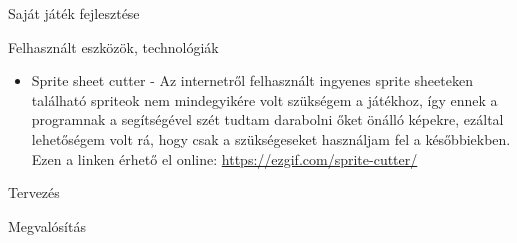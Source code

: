 \begin{MyChapter}{Saját játék fejlesztése}
\begin{MySection}{Felhasznált eszközök, technológiák}
\begin{itemize}
			\item Sprite sheet cutter - Az internetről felhasznált ingyenes sprite sheeteken található spriteok nem mindegyikére volt szükségem a játékhoz, így ennek a programnak a segítségével szét tudtam darabolni őket önálló képekre, ezáltal lehetőségem volt rá, hogy csak a szükségeseket használjam fel a későbbiekben. Ezen a linken érhető el online: \url{https://ezgif.com/sprite-cutter/}
			
		\end{itemize}
	
	\end{MySection}
		
	\begin{MySection}{Tervezés}
	\end{MySection}
		
	\begin{MySection}{Megvalósítás}
		
		
		

\end{MySection}
\end{MyChapter}
